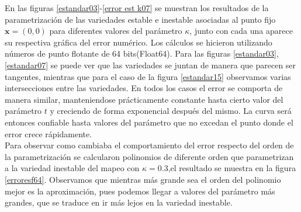 En las figuras \ref{estandar03}-\ref{error est k07} se muestran los resultados de la parametrización de las variedades estable e inestable asociadas al punto fijo $\mathbf{x}=(0,0)$ para diferentes valores del parámetro $\kappa$, junto con cada una aparece su respectiva gráfica del error numérico.   Los cálculos se hicieron utilizando números de punto flotante de 64 bits(Float64). Para las figuras \ref{estandar03}, \ref{estandar07} se puede ver que las variedades se juntan de manera que parecen ser tangentes, mientras que para el caso de la figura \ref{estandar15} observamos varias intersecciones entre las variedades. En todos los casos el error se comporta de manera similar, manteniendose prácticamente constante hasta cierto valor del parámetro $t$ y creciendo de forma exponencial después del mismo. La curva será entonces confiable hasta valores del parámetro que no excedan el punto donde el error crece rápidamente.  \\


Para observar como cambiaba el comportamiento del error respecto del orden de la parametrización se calcularon polinomios de diferente orden que parametrizan a la variedad inestable del mapeo con $\kappa=0.3$,el resultado se muestra en la figura \ref{erroresf64}. Observamos que mientras más grande sea el orden del polinomio mejor es la aproximación, pues podemos llegar a valores del parámetro más grandes, que se traduce en ir más lejos en la variedad inestable. \\

